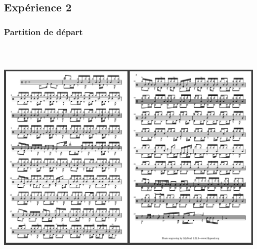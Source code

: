 \subsection{Expérience 2}
\subsubsection{Partition de départ}
\includegraphics[height=120mm, width=160mm]{z_images/3_experimentations/experience_1/partition.png}
